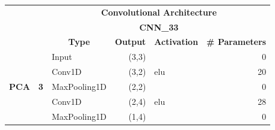 \begin{table}[H]
\centering
\begin{center}
\begin{tabular}{ll|l|r|l|r|}
\cline{3-6}
                                                    &                             & \multicolumn{4}{c|}{\textbf{Convolutional Architecture}}                                                                                                           \\ \cline{3-6} 
                                                    &                             & \multicolumn{4}{c|}{\textbf{CNN\_33}}                                                                                                                                  \\ \cline{3-6} 
                                                    &                             & \multicolumn{1}{c|}{\textbf{Type}} & \multicolumn{1}{c|}{\textbf{Output}} & \multicolumn{1}{c|}{\textbf{Activation}} & \multicolumn{1}{l|}{\textbf{\# Parameters}} \\ \hline
\multicolumn{1}{|l|}{\multirow{8}{*}{\textbf{PCA}}} & \multirow{8}{*}{\textbf{3}} & Input                              & (3,3)                                &                                          & 0                                           \\ \cline{3-6} 
\multicolumn{1}{|l|}{}                              &                             & Conv1D                             & (3,2)                                & elu                                     & 20                                          \\ \cline{3-6} 
\multicolumn{1}{|l|}{}                              &                             & MaxPooling1D                       & (2,2)                                &                                          & 0                                           \\ \cline{3-6} 
\multicolumn{1}{|l|}{}                              &                             & Conv1D                             & (2,4)                                & elu                                     & 28                                          \\ \cline{3-6} 
\multicolumn{1}{|l|}{}                              &                             & MaxPooling1D                       & (1,4)                                &                                          & 0                                           \\ \cline{3-6} 

\end{tabular}
\end{center}
\end{table}
